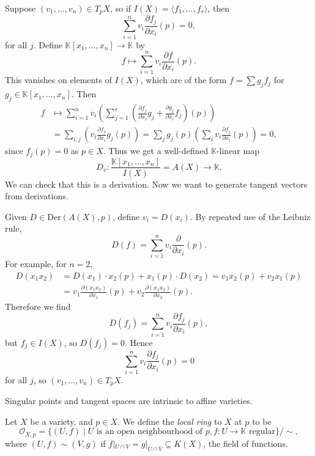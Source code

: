 \documentclass[12pt]{article}
\begin{document}
\begin{proofbox}
	Suppose $(v_1, \ldots, v_n) \in T_pX$, so if $I(X) = \langle f_1, \ldots, f_r\rangle$, then
	\[
	\sum_{i = 1}^n v_i \frac{\partial f_j}{\partial x_i}(p) = 0,
	\]
	for all $j$. Define $\mathbb{K}[x_1, \ldots, x_n] \to \mathbb{K}$ by
	\[
	f \mapsto \sum_{i= 1}^n v_i \frac{\partial f}{\partial x_i}(p).
	\]
	This vanishes on elements of $I(X)$, which are of the form $f = \sum g_j f_j$ for $g_j \in \mathbb{K}[x_1, \ldots, x_n]$. Then
	\begin{align*}
		f &\mapsto \sum_{i = 1}^n v_i \left( \sum_{j = 1}^r \left( \frac{\partial f_j}{\partial x_i} g_j + \frac{\partial g_j}{\partial x_i} f_j \right) (p) \right) \\
		  &= \sum_{i, j} \left( v_i \frac{\partial f_j}{\partial x_i} g_j(p) \right) = \sum_{j} g_j(p) \left( \sum_{i} v_i \frac{\partial f_j}{\partial x_i} (p) \right) = 0,
	\end{align*}
	since $f_j(p) = 0$ as $p \in X$. Thus we get a well-defined $\mathbb{K}$-linear map
	\[
		D_v : \frac{\mathbb{K}[x_1, \ldots, x_n]}{I(X)} = A(X) \to \mathbb{K}.
	\]
	We can check that this is a derivation. Now we want to generate tangent vectors from derivations.

	Given $D \in \mathrm{Der}(A(X), p)$, define $v_i = D(x_i)$. By repeated use of the Leibniz rule,
	\[
	D(f) = \sum_{i = 1}^n v_i \frac{\partial}{\partial x_i}(p).
	\]
	For example, for $n = 2$,
	\begin{align*}
		D(x_1 x_2) &= D(x_1) \cdot x_2(p) + x_1(p) \cdot D(x_2) = v_1 x_2(p) + v_2 x_1(p) \\\
			   &= v_1 \frac{\partial (x_1 x_2)}{\partial x_1}(p) + v_2 \frac{\partial (x_1 x_2)}{\partial x_2}(p).
	\end{align*}
	Therefore we find
	\[
	D(f_j) = \sum_{i = 1}^n v_i \frac{\partial f_j}{\partial x_i}(p),
	\]
	but $f_j \in I(X)$, so $D(f_j) = 0$. Hence
	\[
	\sum_{i = 1}^n v_i \frac{\partial f_j}{\partial x_i}(p) = 0
	\]
	for all $j$, so $(v_1, \ldots, v_n) \in T_pX$.
\end{proofbox}

\begin{remark}
	Singular points and tangent spaces are intrinsic to affine varieties.
\end{remark}

\begin{definition}
	Let $X$ be a variety, and $p \in X$. We define the \emph{local ring} to $X$ at $p$ to be
	\[
		\mathcal{O}_{X, p} = \{(U, f) \mid U \text{ is an open neighbourhood of } p, f: U \to \mathbb{K} \text{ regular}\} / \sim,
	\]
	where $(U, f) \sim (V, g)$ if $f|_{U \cap V} = g|_{U \cap V}\subseteq K(X)$, the field of functions.
\end{definition}
\end{document}

